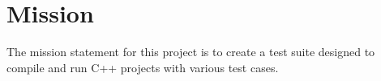 
\chapter{Mission}

The mission statement for this project is to create a test suite designed to compile and run C++ projects with various test cases.